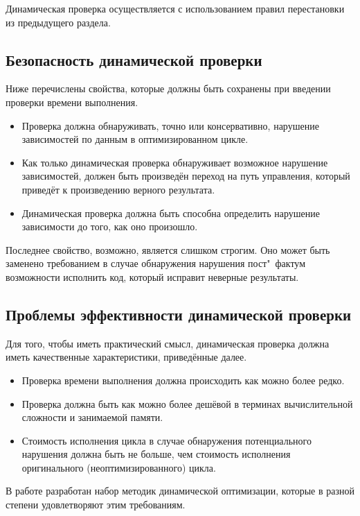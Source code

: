 Динамическая проверка осуществляется с использованием правил перестановки из предыдущего раздела.

\subsection{Безопасность динамической проверки}

Ниже перечислены свойства, которые должны быть сохранены при введении проверки времени выполнения.

\begin{itemize}
	\item Проверка должна обнаруживать, точно или консервативно, нарушение зависимостей по данным в оптимизированном цикле.
	\item Как только динамическая проверка обнаруживает возможное нарушение зависимостей, должен быть произведён переход на путь управления, который приведёт к произведению верного результата.
	\item Динамическая проверка должна быть способна определить нарушение зависимости до того, как оно произошло.
\end{itemize}

Последнее свойство, возможно, является слишком строгим. Оно может быть заменено требованием в случае обнаружения нарушения пост"~фактум возможности исполнить код, который исправит неверные результаты.

\subsection{Проблемы эффективности динамической проверки}

Для того, чтобы иметь практический смысл, динамическая проверка должна иметь качественные характеристики, приведённые далее.

\begin{itemize}
	\item Проверка времени выполнения должна происходить как можно более редко.
	\item Проверка должна быть как можно более дешёвой в терминах вычислительной сложности и занимаемой памяти.
	\item Стоимость исполнения цикла в случае обнаружения потенциального нарушения должна быть не больше, чем стоимость исполнения оригинального (неоптимизированного) цикла.
\end{itemize}

В работе \cite{ZuckPFGH02} разработан набор методик динамической оптимизации, которые в разной степени удовлетворяют этим требованиям.

